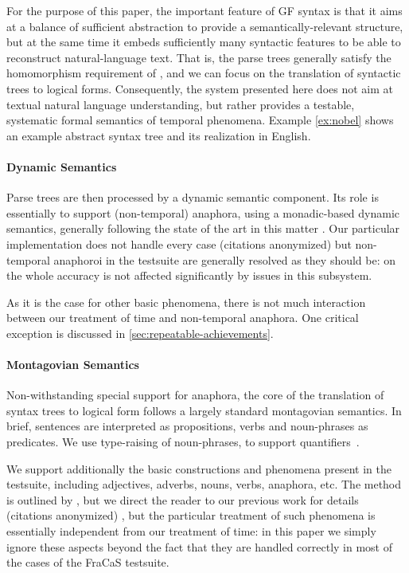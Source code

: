 \documentclass[a4paper,11pt]{article}
\begin{document}
For the purpose of this paper, the important feature of GF
syntax is that it aims at a balance of sufficient abstraction to provide a
semantically-relevant structure, but at the same time it embeds
sufficiently many syntactic features to be able to reconstruct
natural-language text. That is, the parse trees generally satisfy the
homomorphism requirement of \citet{montague_english_1970,montague_proper_1974}, and
we can focus on the translation of syntactic trees to logical forms.
%
Consequently, the system presented
here does not aim at textual natural language understanding, but rather
provides a testable, systematic formal semantics of temporal phenomena.
Example \ref{ex:nobel} shows an example abstract syntax tree and its
realization in English.

\paragraph{Dynamic Semantics}
Parse trees are then processed by a dynamic semantic component.
Its role is essentially to support  (non-temporal) anaphora, using a
monadic-based dynamic semantics, generally following the state of the
art in this matter
\citep{unger_dynamic_2011,charlow_monadic_2015,charlow_modular_2017}.
Our particular implementation does not handle every case \ifanon
(citations anonymized) \else \citet{bernardy_computational_2020,bernardy_wide-coverage_2019} \fi
but non-temporal anaphoroi in the testsuite are generally resolved as
they should be: on the whole accuracy is not affected significantly by
issues in this subsystem.

As it is the case for other basic phenomena, there is not much
interaction between our treatment of time and non-temporal
anaphora. One critical exception is discussed in
\cref{sec:repeatable-achievements}.


\paragraph{Montagovian Semantics}
Non-withstanding special support for anaphora, the core of the translation of syntax trees
to logical form follows a largely standard
montagovian semantics. In brief, sentences are interpreted as
propositions, verbs and noun-phrases as predicates.  We use
type-raising of noun-phrases, to support
quantifiers~\citep{montague_proper_1974}.

We support additionally the basic constructions and phenomena present
in the testsuite, including adjectives, adverbs, nouns, verbs,
anaphora, etc. The method is outlined by
\citet{montague_english_1970,montague_proper_1973}, but we direct the
reader to our previous work for details \ifanon (citations anonymized)
\else \citet{bernardy_type-theoretical_2017,bernardy_wide-coverage_2019} \fi, but the particular
treatment of such phenomena is essentially independent from our
treatment of time: in this paper we simply ignore these aspects beyond
the fact that they are handled correctly in most of the cases of the
FraCaS testsuite.
\end{document}
